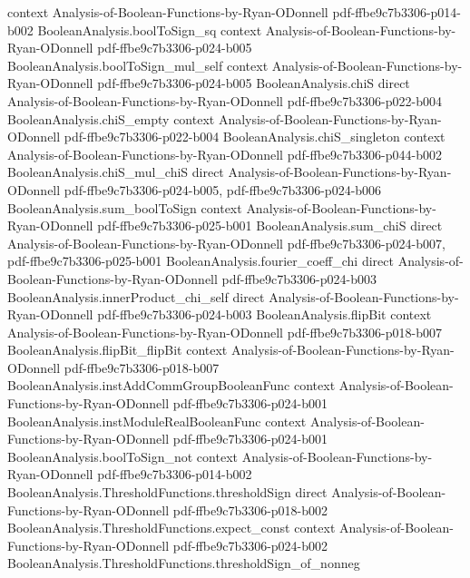 \begin{theorem}
  {context}
  {Analysis-of-Boolean-Functions-by-Ryan-ODonnell}
  {pdf-ffbe9c7b3306-p014-b002}
\proofstep
  {BooleanAnalysis.boolToSign_sq}
  {context}
  {Analysis-of-Boolean-Functions-by-Ryan-ODonnell}
  {pdf-ffbe9c7b3306-p024-b005}
\proofstep
  {BooleanAnalysis.boolToSign_mul_self}
  {context}
  {Analysis-of-Boolean-Functions-by-Ryan-ODonnell}
  {pdf-ffbe9c7b3306-p024-b005}
\proofstep
  {BooleanAnalysis.chiS}
  {direct}
  {Analysis-of-Boolean-Functions-by-Ryan-ODonnell}
  {pdf-ffbe9c7b3306-p022-b004}
\proofstep
  {BooleanAnalysis.chiS_empty}
  {context}
  {Analysis-of-Boolean-Functions-by-Ryan-ODonnell}
  {pdf-ffbe9c7b3306-p022-b004}
\proofstep
  {BooleanAnalysis.chiS_singleton}
  {context}
  {Analysis-of-Boolean-Functions-by-Ryan-ODonnell}
  {pdf-ffbe9c7b3306-p044-b002}
\proofstep
  {BooleanAnalysis.chiS_mul_chiS}
  {direct}
  {Analysis-of-Boolean-Functions-by-Ryan-ODonnell}
  {pdf-ffbe9c7b3306-p024-b005,
    pdf-ffbe9c7b3306-p024-b006}
\proofstep
  {BooleanAnalysis.sum_boolToSign}
  {context}
  {Analysis-of-Boolean-Functions-by-Ryan-ODonnell}
  {pdf-ffbe9c7b3306-p025-b001}
\proofstep
  {BooleanAnalysis.sum_chiS}
  {direct}
  {Analysis-of-Boolean-Functions-by-Ryan-ODonnell}
  {pdf-ffbe9c7b3306-p024-b007,
    pdf-ffbe9c7b3306-p025-b001}
\proofstep
  {BooleanAnalysis.fourier_coeff_chi}
  {direct}
  {Analysis-of-Boolean-Functions-by-Ryan-ODonnell}
  {pdf-ffbe9c7b3306-p024-b003}
\proofstep
  {BooleanAnalysis.innerProduct_chi_self}
  {direct}
  {Analysis-of-Boolean-Functions-by-Ryan-ODonnell}
  {pdf-ffbe9c7b3306-p024-b003}
\proofstep
  {BooleanAnalysis.flipBit}
  {context}
  {Analysis-of-Boolean-Functions-by-Ryan-ODonnell}
  {pdf-ffbe9c7b3306-p018-b007}
\proofstep
  {BooleanAnalysis.flipBit_flipBit}
  {context}
  {Analysis-of-Boolean-Functions-by-Ryan-ODonnell}
  {pdf-ffbe9c7b3306-p018-b007}
\proofstep
  {BooleanAnalysis.instAddCommGroupBooleanFunc}
  {context}
  {Analysis-of-Boolean-Functions-by-Ryan-ODonnell}
  {pdf-ffbe9c7b3306-p024-b001}
\proofstep
  {BooleanAnalysis.instModuleRealBooleanFunc}
  {context}
  {Analysis-of-Boolean-Functions-by-Ryan-ODonnell}
  {pdf-ffbe9c7b3306-p024-b001}
\proofstep
  {BooleanAnalysis.boolToSign_not}
  {context}
  {Analysis-of-Boolean-Functions-by-Ryan-ODonnell}
  {pdf-ffbe9c7b3306-p014-b002}
\proofstep
  {BooleanAnalysis.ThresholdFunctions.thresholdSign}
  {direct}
  {Analysis-of-Boolean-Functions-by-Ryan-ODonnell}
  {pdf-ffbe9c7b3306-p018-b002}
\proofstep
  {BooleanAnalysis.ThresholdFunctions.expect_const}
  {context}
  {Analysis-of-Boolean-Functions-by-Ryan-ODonnell}
  {pdf-ffbe9c7b3306-p024-b002}
\proofstep
  {BooleanAnalysis.ThresholdFunctions.thresholdSign_of_nonneg}

\end{theorem}
